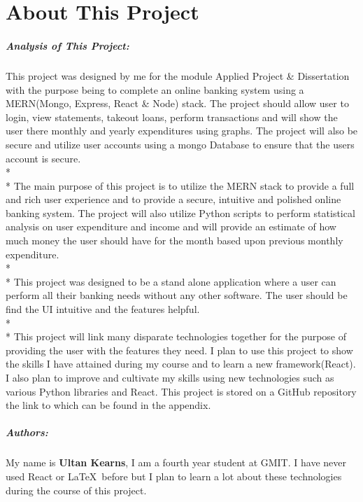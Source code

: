 
\chapter*{About This Project}
\paragraph{Analysis of This Project: }
This project was designed by me for the module Applied Project \& Dissertation with the purpose being
to complete an online banking system using a MERN(Mongo, Express, React \& Node) stack.
The project should allow user to login, view statements, takeout loans, perform transactions and
will show the user there monthly and yearly expenditures using graphs. The project will also be
secure and utilize user accounts using a mongo Database to ensure that the users account is secure.
\\*
\\*
The main purpose of this project is to utilize the MERN stack to provide a full and rich user
experience and to provide a secure, intuitive and polished online banking system.  The project
will also utilize Python scripts to perform statistical analysis on user expenditure and income
and will provide an estimate of how much money the user should have for the month based upon previous
monthly expenditure.
\\*
\\*
This project was designed to be a stand alone application where a user can perform all their
banking needs without any other software.  The user should be find the UI intuitive and the
features helpful.
\\*
\\*
This project will link many disparate technologies together for the purpose of providing the user
with the features they need.  I plan to use this project to show the skills I have attained during
my course and to learn a new framework(React). I also plan to improve and cultivate my skills
using new technologies such as various Python libraries and React. This project is stored on a GitHub
repository the link to which can be found in the appendix.
\paragraph{Authors: }
My name is \textbf{Ultan Kearns}, I am a fourth year student at GMIT. I have never used
React or \LaTeX\  before but I plan to learn a lot about these technologies during the course of this project.


